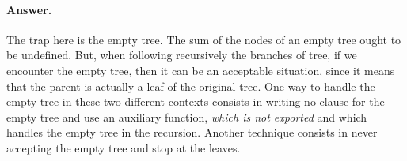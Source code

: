 \paragraph{Answer.}

The trap here is the empty tree. The sum of the nodes of an empty tree
ought to be undefined. But, when following recursively the
branches of tree, if we encounter the empty tree, then it can be an
acceptable situation, since it means that the parent is actually a
leaf of the original tree. One way to handle the empty tree in these
two different contexts consists in writing no clause for the empty
tree and use an auxiliary function, \emph{which is not exported} and
which handles the empty tree in the recursion. Another technique
consists in never accepting the empty tree and stop at the leaves.
